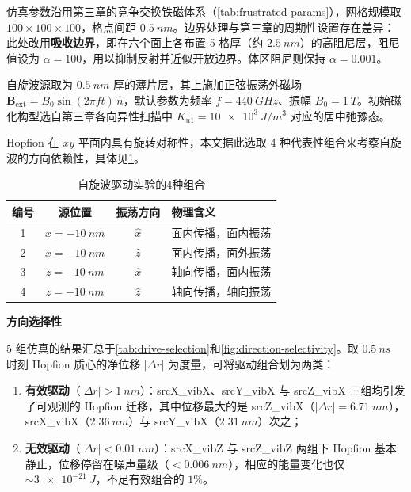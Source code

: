 仿真参数沿用第三章的竞争交换铁磁体系（\cref{tab:frustrated-params}），网格规模取 $100 \times 100 \times 100$，格点间距 $\SI{0.5}{nm}$。边界处理与第三章的周期性设置存在差异：此处改用\textbf{吸收边界}，即在六个面上各布置 5 格厚（约 $\SI{2.5}{nm}$）的高阻尼层，阻尼值设为 $\alpha = 100$，用以抑制反射并近似开放边界。体区阻尼则保持 $\alpha = 0.001$。

自旋波源取为 $\SI{0.5}{nm}$ 厚的薄片层，其上施加正弦振荡外磁场 $\mathbf{B}_{\text{ext}} = B_0 \sin(2\pi f t) \, \hat{n}$，默认参数为频率 $f = \SI{440}{GHz}$、振幅 $B_0 = \SI{1}{T}$。初始磁化构型选自第三章各向异性扫描中 $K_{u1} = \SI{10e3}{J/m^3}$ 对应的居中弛豫态。

Hopfion 在 $xy$ 平面内具有旋转对称性，本文据此选取 4 种代表性组合来考察自旋波的方向依赖性，具体见\cref{tab:sw-combos}。

\begin{table}[htbp]
  \centering
  \caption{自旋波驱动实验的4种组合}
  \label{tab:sw-combos}
  \begin{tabular}{cccl}
    \toprule
    编号 & 源位置 & 振荡方向 & 物理含义 \\
    \midrule
    1 & $x = -\SI{10}{nm}$ & $\hat{x}$ & 面内传播，面内振荡 \\
    2 & $x = -\SI{10}{nm}$ & $\hat{z}$ & 面内传播，面外振荡 \\
    3 & $z = -\SI{10}{nm}$ & $\hat{x}$ & 轴向传播，面内振荡 \\
    4 & $z = -\SI{10}{nm}$ & $\hat{z}$ & 轴向传播，轴向振荡 \\
    \bottomrule
  \end{tabular}
\end{table}

\par\noindent\textbf{方向选择性}\par\nobreak

5 组仿真的结果汇总于\cref{tab:drive-selection}和\cref{fig:direction-selectivity}。取 $\SI{0.5}{ns}$ 时刻 Hopfion 质心的净位移 $|\Delta r|$ 为度量，可将驱动组合划为两类：

\begin{enumerate}
  \item \textbf{有效驱动}（$|\Delta r| > \SI{1}{nm}$）：srcX\_vibX、srcY\_vibX 与 srcZ\_vibX 三组均引发了可观测的 Hopfion 迁移，其中位移最大的是 srcZ\_vibX（$|\Delta r| = \SI{6.71}{nm}$），srcX\_vibX（$\SI{2.36}{nm}$）与 srcY\_vibX（$\SI{2.31}{nm}$）次之；
  \item \textbf{无效驱动}（$|\Delta r| < \SI{0.01}{nm}$）：srcX\_vibZ 与 srcZ\_vibZ 两组下 Hopfion 基本静止，位移停留在噪声量级（$< \SI{0.006}{nm}$），相应的能量变化也仅 $\sim\SI{3e-21}{J}$，不足有效组合的 $1\%$。
\end{enumerate}

